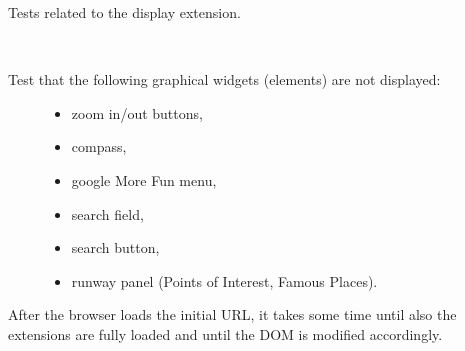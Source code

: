 \documentclass[letterpaper,10pt,english]{sphinxmanual}
\begin{document}
\begin{fulllineitems}
\label{test_display_kiosk:test_display_kiosk.TestBaseDisplay}
Tests related to the display extension.

\begin{fulllineitems}
\label{test_display_kiosk:test_display_kiosk.TestBaseDisplay.test_widgets_not_displayed}~\begin{description}
\item[{Test that the following graphical widgets (elements) are not displayed:}] \leavevmode\begin{itemize}
\item {} 
zoom in/out buttons,

\item {} 
compass,

\item {} 
google More Fun menu,

\item {} 
search field,

\item {} 
search button,

\item {} 
runway panel (Points of Interest, Famous Places).

\end{itemize}

\end{description}

After the browser loads the initial URL, it takes some time
until also the extensions are fully loaded and until the DOM is
modified accordingly.

\end{fulllineitems}


\end{fulllineitems}

\end{document}

